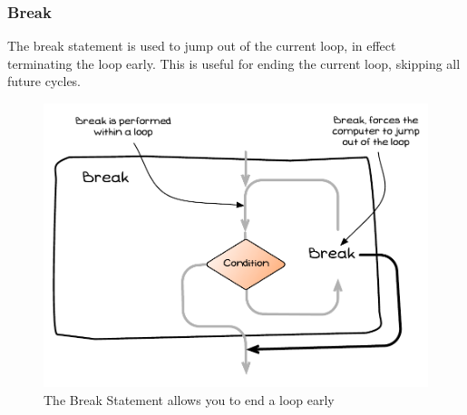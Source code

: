 \clearpage
\subsubsection{Break} %
\label{sub:break}

The break statement is used to jump out of the current loop, in effect terminating the loop early. This is useful for ending the current loop, skipping all future cycles.

\begin{figure}[h]
   \centering
   \includegraphics[width=\textwidth]{./topics/control-flow/diagrams/Break} 
   \caption{The Break Statement allows you to end a loop early}
   \label{fig:break}
\end{figure}



